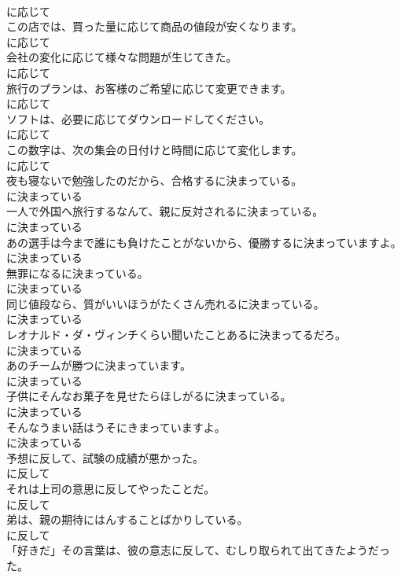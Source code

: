 \documentclass[8pt]{extreport}
\begin{document}
\begin{CJK}{UTF8}{min}
\\	に応じて
\\	この店では、買った量に応じて商品の値段が安くなります。	
\\	に応じて
\\	会社の変化に応じて様々な問題が生じてきた。	
\\	に応じて
\\	旅行のプランは、お客様のご希望に応じて変更できます。	
\\	に応じて
\\	ソフトは、必要に応じてダウンロードしてください。	
\\	に応じて
\\	この数字は、次の集会の日付けと時間に応じて変化します。	
\\	に応じて
\\	夜も寝ないで勉強したのだから、合格するに決まっている。	
\\	に決まっている
\\	一人で外国へ旅行するなんて、親に反対されるに決まっている。	
\\	に決まっている
\\	あの選手は今まで誰にも負けたことがないから、優勝するに決まっていますよ。	
\\	に決まっている
\\	無罪になるに決まっている。	
\\	に決まっている
\\	同じ値段なら、質がいいほうがたくさん売れるに決まっている。	
\\	に決まっている
\\	レオナルド・ダ・ヴィンチくらい聞いたことあるに決まってるだろ。	
\\	に決まっている
\\	あのチームが勝つに決まっています。	
\\	に決まっている
\\	子供にそんなお菓子を見せたらほしがるに決まっている。	
\\	に決まっている
\\	そんなうまい話はうそにきまっていますよ。	
\\	に決まっている
\\	予想に反して、試験の成績が悪かった。	
\\	に反して
\\	それは上司の意思に反してやったことだ。	
\\	に反して
\\	弟は、親の期待にはんすることばかりしている。	
\\	に反して
\\	「好きだ」その言葉は、彼の意志に反して、むしり取られて出てきたようだった。	

\end{CJK}
\end{document}
